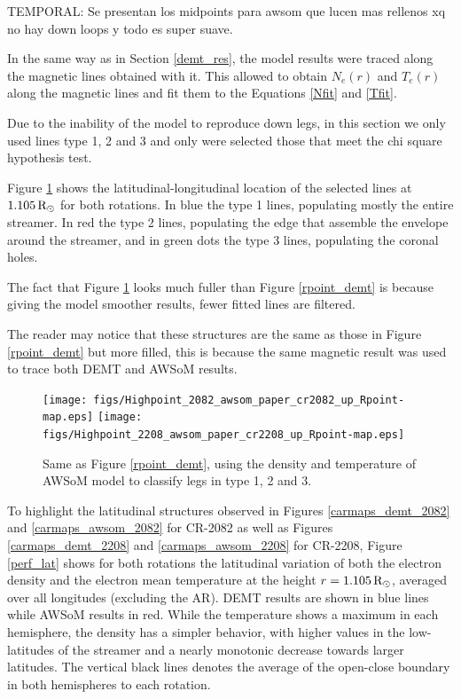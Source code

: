 \documentclass[namedreferences]{solarphysics}
\newcommand{\mrsun}{{\rm R_\odot}}
\def\temp#1{\textcolor{mygray}{TEMPORAL: #1}}
\begin{document}
\begin{article}
\temp{Se presentan los midpoints para awsom que lucen mas rellenos xq no hay down loops y todo es super suave.}

In the same way as in Section \ref{demt_res}, the model results were traced along the magnetic lines obtained with it. This allowed to obtain $N_e(r)$ and $T_e(r)$ along the magnetic lines and fit them to the Equations \ref{Nfit} and \ref{Tfit}.

Due to the inability of the model to reproduce down legs, in this section we only used lines type 1, 2 and 3 and only were selected those that meet the chi square hypothesis test.

Figure \ref{rpoint_awsom} shows the latitudinal-longitudinal location of the selected lines at $1.105\,\mrsun$ for both rotations. In blue the type 1 lines, populating mostly the entire streamer. In red the type 2 lines, populating the edge that assemble the envelope around the streamer, and in green dots the type 3 lines, populating the coronal holes.

The fact that Figure \ref{rpoint_awsom} looks much fuller than Figure \ref{rpoint_demt} is because giving the model smoother results, fewer fitted lines are filtered.

The reader may notice that these structures are the same as those in Figure \ref{rpoint_demt} but more filled, this is because the same magnetic result was used to trace both DEMT and AWSoM results.


\begin{figure}[h!]
\begin{center}
\texttt{[image: figs/Highpoint\_2082\_awsom\_paper\_cr2082\_up\_Rpoint-map.eps]}
\texttt{[image: figs/Highpoint\_2208\_awsom\_paper\_cr2208\_up\_Rpoint-map.eps]}
\caption{Same as Figure \ref{rpoint_demt}, using the density and temperature of AWSoM model to classify legs in type 1, 2 and 3.}
\label{rpoint_awsom}
\end{center}
\end{figure} 


To highlight the latitudinal structures observed in Figures \ref{carmaps_demt_2082} and \ref{carmaps_awsom_2082} for CR-2082 as well as Figures \ref{carmaps_demt_2208} and \ref{carmaps_awsom_2208} for CR-2208, Figure \ref{perf_lat} shows for both rotations the latitudinal variation  of both the electron density and the electron mean temperature at the height $r=1.105\,\mrsun$, averaged over all longitudes (excluding the AR). DEMT results are shown in blue lines while AWSoM results in red. While the temperature shows a maximum in each hemisphere, the density has a simpler behavior, with higher values in the low-latitudes of the streamer and a nearly monotonic decrease towards larger latitudes. The vertical black lines denotes the average of the open-close boundary in both hemispheres to each rotation.


\end{article}
\end{document}

